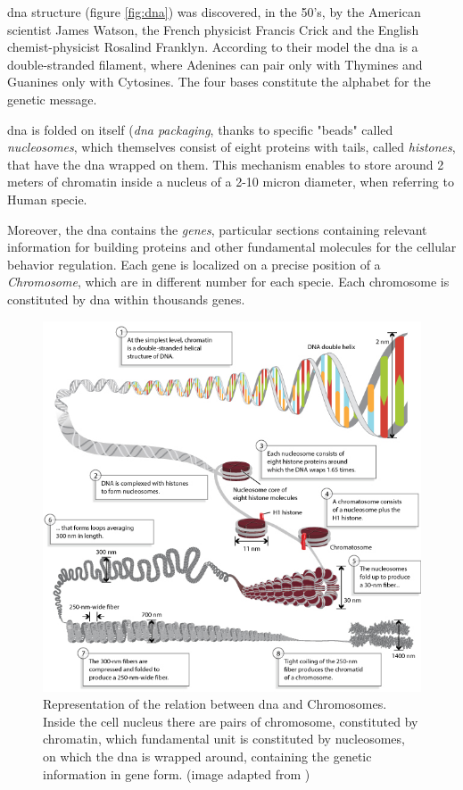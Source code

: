 \gls{dna} structure (figure \ref{fig:dna}) was discovered, in the 50's, by the American scientist James Watson, the French physicist Francis Crick and the English chemist-physicist Rosalind Franklyn.
According to their model the \gls{dna} is a double-stranded filament, where Adenines can pair only with Thymines and Guanines only with Cytosines.
The four bases constitute the alphabet for the genetic message.

\gls{dna} is folded on itself (\textit{\gls{dna} packaging}, thanks to specific "beads" called \textit{nucleosomes}, which themselves consist of eight proteins with tails, called \textit{histones}, that have the \gls{dna} wrapped on them.
This mechanism enables to store around 2 meters of chromatin inside a nucleus of a 2-10 micron diameter, when referring to Human specie.

Moreover, the \gls{dna} contains the \textit{genes}, particular sections containing relevant information for building proteins and other fundamental molecules for the cellular behavior regulation.
Each gene is localized on a precise position of a \textit{Chromosome}, which are in different number for each specie.
Each chromosome is constituted by \gls{dna} within thousands genes.

\begin{figure}[H]
\centering
\includegraphics[width=\textwidth, keepaspectratio]{img/intro/dna2.jpg}
\caption[Chromosomes and \gls{dna}]{Representation of the relation between \gls{dna} and Chromosomes.
Inside the cell nucleus there are pairs of chromosome, constituted by chromatin, which fundamental unit is constituted by nucleosomes, on which the \gls{dna} is wrapped around, containing the genetic information in gene form. (image adapted from \cite{Annunziato2008})}
\label{fig:dnachromosome}
\end{figure}


